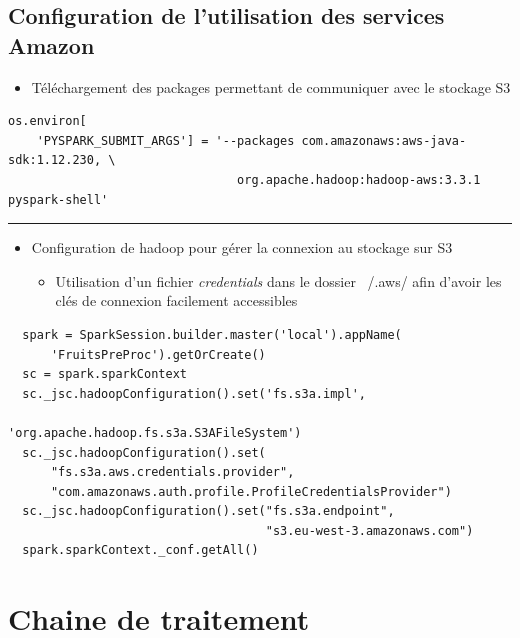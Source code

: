 \documentclass[8pt,aspectratio=169,hyperref={unicode=true}]{beamer}
\begin{document}
\subsection{Configuration de l'utilisation des services Amazon}
\begin{frame}[fragile]{\insertsection}{\insertsubsection}
  \begin{itemize}
    \item Téléchargement des packages permettant de communiquer avec le stockage S3
  \end{itemize}
  \begin{verbatim}
os.environ[
    'PYSPARK_SUBMIT_ARGS'] = '--packages com.amazonaws:aws-java-sdk:1.12.230, \
                                org.apache.hadoop:hadoop-aws:3.3.1 pyspark-shell'
  \end{verbatim}

  \vfill
  \hrule

  \begin{itemize}
    \item Configuration de hadoop pour gérer la connexion au stockage sur S3
    \begin{itemize}
      \item Utilisation d'un fichier \emph{credentials} dans le dossier ~/.aws/ afin d'avoir les clés de connexion facilement accessibles
    \end{itemize}
  \end{itemize}
  \begin{verbatim}
  spark = SparkSession.builder.master('local').appName(
      'FruitsPreProc').getOrCreate()
  sc = spark.sparkContext
  sc._jsc.hadoopConfiguration().set('fs.s3a.impl',
                                    'org.apache.hadoop.fs.s3a.S3AFileSystem')
  sc._jsc.hadoopConfiguration().set(
      "fs.s3a.aws.credentials.provider",
      "com.amazonaws.auth.profile.ProfileCredentialsProvider")
  sc._jsc.hadoopConfiguration().set("fs.s3a.endpoint",
                                    "s3.eu-west-3.amazonaws.com")
  spark.sparkContext._conf.getAll()
    \end{verbatim}
\end{frame}

\section{Chaine de traitement}
\end{document}
